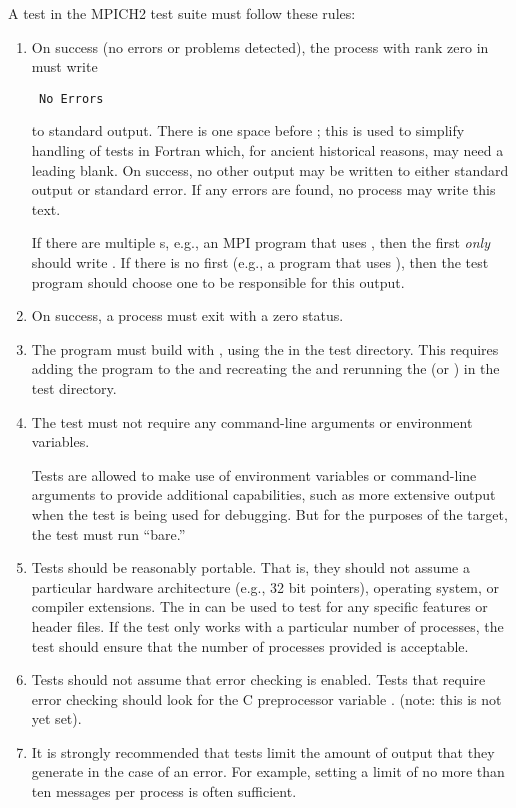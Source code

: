 A test in the MPICH2 test suite must follow these rules:
\begin{enumerate}
\item On success (no errors or problems detected), the process with
rank zero in  must write
\begin{verbatim}
 No Errors
\end{verbatim}
to standard output.  
There is one space before ; this is used to simplify handling
of tests in Fortran which, for ancient historical reasons, may need a
leading blank.  On success, no other output may be written to either
standard output or standard error.
If any errors are found, no process may write
this text.

If there are multiple s, e.g., an MPI program
that uses , then the first 
\emph{only} should write .  If there is no first
 (e.g., a program that uses
), then the test program should choose one
 to be responsible for this output.

\item On success, a process must exit with a zero status.

\item The program must build with , using the
 in the test directory.  This requires adding the
program to the  and recreating the
 and rerunning the  (or
) in the test directory.

\item The test must not require any command-line arguments or
environment variables.

Tests are allowed to make use of environment
variables or command-line arguments to provide additional
capabilities, such as more extensive output when the test is being
used for debugging.  But for the purposes of the 
target, the test must run ``bare.''

\item Tests should be reasonably portable.  That is, they should not
assume a particular hardware architecture (e.g., 32 bit pointers),
operating system, or compiler extensions.  The  in
 can be used to test for any specific
features or header files.  If the test only works with a particular
number of processes, the test should ensure that the number of
processes provided is acceptable.  

\item Tests should not assume that error checking is enabled.  Tests
that require error checking should look for the C preprocessor
variable . (note: this is not yet set).

\item It is strongly recommended that tests limit the amount of output
that they generate in the case of an error.  For example, setting a
limit of no more than ten messages per process is often sufficient.  
\end{enumerate}

